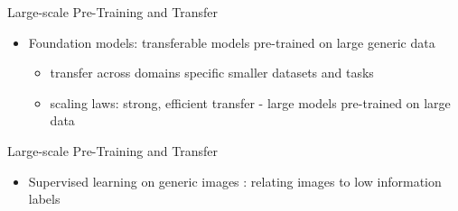 \begin{frame}
\end{frame}

\begin{frame}{Large-scale Pre-Training and Transfer}
\protect\hypertarget{large-scale-pre-training-and-transfer}{}
\begin{itemize}
\tightlist
\item
  Foundation models: transferable models pre-trained on large generic
  data

  \begin{itemize}
  \tightlist
  \item
    transfer across domains specific smaller datasets and tasks
  \item
    scaling laws: strong, efficient transfer - large models pre-trained
    on large data
  \end{itemize}
\end{itemize}

\end{frame}

\begin{frame}{Large-scale Pre-Training and Transfer}
\protect\hypertarget{large-scale-pre-training-and-transfer-1}{}
\begin{itemize}
\tightlist
\item
  Supervised learning on generic images : relating images to low
  information labels
\end{itemize}

\end{frame}

